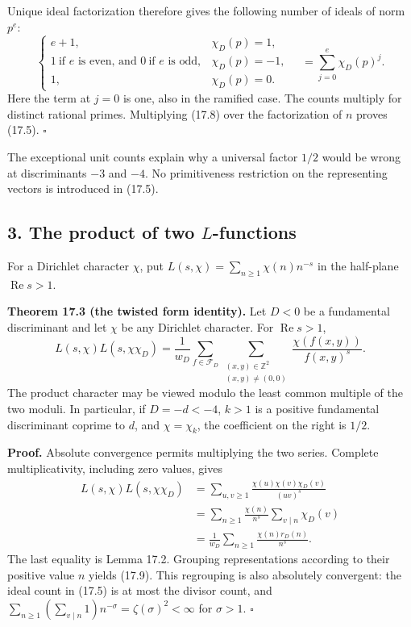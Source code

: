 \documentclass[
  11pt,
  a4paper,
]{article}
\begin{document}
Unique ideal factorization therefore gives the following number of
ideals of norm \(p^e\): \[
 \begin{cases}
 e+1,&\chi_D(p)=1,\\
 1\ \text{if }e\text{ is even, and }0\ \text{if }e\text{ is odd},
       &\chi_D(p)=-1,\\
 1,&\chi_D(p)=0.
 \end{cases}
 \quad=\sum_{j=0}^{e}\chi_D(p)^j.
 \tag{17.8}
\] Here the term at \(j=0\) is one, also in the ramified case. The
counts multiply for distinct rational primes. Multiplying (17.8) over
the factorization of \(n\) proves (17.5). \(\square\)

The exceptional unit counts explain why a universal factor \(1/2\) would
be wrong at discriminants \(-3\) and \(-4\). No primitiveness
restriction on the representing vectors is introduced in (17.5).

\subsection{\texorpdfstring{3. The product of two
\(L\)-functions}{3. The product of two L-functions}}\label{the-product-of-two-l-functions}

For a Dirichlet character \(\chi\), put
\(L(s,\chi)=\sum_{n\ge1}\chi(n)n^{-s}\) in the half-plane
\(\operatorname{Re}s>1\).

\textbf{Theorem 17.3 (the twisted form identity).} Let \(D<0\) be a
fundamental discriminant and let \(\chi\) be any Dirichlet character.
For \(\operatorname{Re}s>1\), \[
 L(s,\chi)L(s,\chi\chi_D)
 =\frac1{w_D}\sum_{f\in\mathcal F_D}
   \sum_{\substack{(x,y)\in\mathbb Z^2\\(x,y)\ne(0,0)}}
          \frac{\chi(f(x,y))}{f(x,y)^s}.
 \tag{17.9}
\] The product character may be viewed modulo the least common multiple
of the two moduli. In particular, if \(D=-d<-4\), \(k>1\) is a positive
fundamental discriminant coprime to \(d\), and \(\chi=\chi_k\), the
coefficient on the right is \(1/2\).

\textbf{Proof.} Absolute convergence permits multiplying the two series.
Complete multiplicativity, including zero values, gives \[
 \begin{aligned}
 L(s,\chi)L(s,\chi\chi_D)
 &=\sum_{u,v\ge1}\frac{\chi(u)\chi(v)\chi_D(v)}{(uv)^s}\\
 &=\sum_{n\ge1}\frac{\chi(n)}{n^s}\sum_{v\mid n}\chi_D(v)\\
 &=\frac1{w_D}\sum_{n\ge1}\frac{\chi(n)r_D(n)}{n^s}.
 \end{aligned}
 \tag{17.10}
\] The last equality is Lemma 17.2. Grouping representations according
to their positive value \(n\) yields (17.9). This regrouping is also
absolutely convergent: the ideal count in (17.5) is at most the divisor
count, and
\(\sum_{n\ge1}(\sum_{v\mid n}1)n^{-\sigma}=\zeta(\sigma)^2<\infty\) for
\(\sigma>1\). \(\square\)
\end{document}

